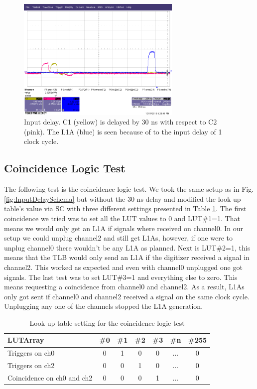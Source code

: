 \begin{figure}[htbp!] 
\centering    
\includegraphics[width=0.7\textwidth]{TLB_Test_30ns_delay.png}
\caption[Input Delay]{Input delay. C1 (yellow) is delayed by 30 ns with respect to C2 (pink). The L1A (blue) is seen because of to the input delay of 1 clock cycle.}
\label{fig:InputDelayResults}
\end{figure}

\subsection{Coincidence Logic Test}

The following test is the coincidence logic test. We took the same setup as in Fig. \ref{fig:InputDelaySchema} but without the 30 ns delay and modified the look up table's value via SC with three different settings presented in Table \ref{table:coincidence}. The first coincidence we tried was to set all the LUT values to 0 and LUT\#1=1. That means we would only get an L1A if signals where received on channel0. In our setup we could unplug channel2 and still get L1As, however, if one were to unplug channel0 there wouldn't be any L1A as planned. Next is LUT\#2=1, this means that the TLB would only send an L1A if the digitizer received a signal in channel2. This worked as expected and even with channel0 unplugged one got signals. The last test was to set LUT\#3=1 and everything else to zero. This means requesting a coincidence from channel0 and channel2. As a result, L1As only got sent if channel0 and channel2 received a signal on the same clock cycle. Unplugging any one of the channels stopped the L1A generation.

\begin{table}[htbp!]
\caption{Look up table setting for the coincidence logic test}
\centering
\label{table:coincidence}
\begin{tabular}{l c c c c c c}
\toprule
LUTArray & \#0 & \#1 & \#2 & \#3 & \#n & \#255 \\
\midrule
Triggers on ch0 & 0 & 1 & 0  & 0 & ... & 0 \\
Triggers on ch2 & 0 & 0 & 1  & 0 & ... & 0 \\
Coincidence on ch0 and ch2 & 0 & 0 & 0  & 1 & ... & 0 \\
\bottomrule
\end{tabular}
\end{table}


